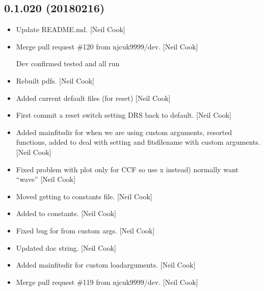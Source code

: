 \documentclass[a4paper,10pt,english]{report}
\begin{document}
\subsection{0.1.020 (2018\sphinxhyphen{}02\sphinxhyphen{}16)}
\label{\detokenize{misc/changelog:id502}}\begin{itemize}
\item {} 
Update README.md. {[}Neil Cook{]}

\item {} 
Merge pull request \#120 from njcuk9999/dev. {[}Neil Cook{]}

Dev \sphinxhyphen{} confirmed tested and all run

\item {} 
Rebuilt pdfs. {[}Neil Cook{]}

\item {} 
Added current default files (for reset) {[}Neil Cook{]}

\item {} 
First commit \sphinxhyphen{} a reset switch \sphinxhyphen{} setting DRS back to default. {[}Neil
Cook{]}

\item {} 
Added mainfitsdir for when we are using custom arguments, resorted
functions, added  to deal with
setting  and fitsfilename with custom arguments. {[}Neil
Cook{]}

\item {} 
Fixed problem with plot  only for CCF \sphinxhyphen{} so use x instead)
normally want “wave” {[}Neil Cook{]}

\item {} 
Moved  getting to constants file. {[}Neil Cook{]}

\item {} 
Added  to constants. {[}Neil Cook{]}

\item {} 
Fixed bug for  from custom args. {[}Neil Cook{]}

\item {} 
Updated doc string. {[}Neil Cook{]}

\item {} 
Added mainfitsdir for custom loadarguments. {[}Neil Cook{]}

\item {} 
Merge pull request \#119 from njcuk9999/dev. {[}Neil Cook{]}


\end{itemize}
\end{document}
